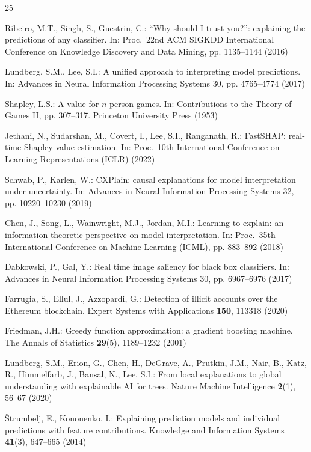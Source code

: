 \documentclass[runningheads]{llncs}
\begin{document}
\begin{thebibliography}{25}

Ribeiro, M.T., Singh, S., Guestrin, C.: ``Why should I trust you?'':
explaining the predictions of any classifier. In: Proc.\ 22nd ACM SIGKDD
International Conference on Knowledge Discovery and Data Mining,
pp. 1135--1144 (2016)

Lundberg, S.M., Lee, S.I.: A unified approach to interpreting model
predictions. In: Advances in Neural Information Processing Systems 30,
pp. 4765--4774 (2017)

Shapley, L.S.: A value for $n$-person games. In: Contributions to the
Theory of Games II, pp. 307--317. Princeton University Press (1953)

Jethani, N., Sudarshan, M., Covert, I., Lee, S.I., Ranganath, R.: FastSHAP:
real-time Shapley value estimation. In: Proc.\ 10th International
Conference on Learning Representations (ICLR) (2022)

Schwab, P., Karlen, W.: CXPlain: causal explanations for model
interpretation under uncertainty. In: Advances in Neural Information
Processing Systems 32, pp. 10220--10230 (2019)

Chen, J., Song, L., Wainwright, M.J., Jordan, M.I.: Learning to explain: an
information-theoretic perspective on model interpretation. In: Proc.\ 35th
International Conference on Machine Learning (ICML), pp. 883--892 (2018)

Dabkowski, P., Gal, Y.: Real time image saliency for black box classifiers.
In: Advances in Neural Information Processing Systems 30, pp. 6967--6976
(2017)

Farrugia, S., Ellul, J., Azzopardi, G.: Detection of illicit accounts over
the Ethereum blockchain. Expert Systems with Applications \textbf{150},
113318 (2020)

Friedman, J.H.: Greedy function approximation: a gradient boosting machine.
The Annals of Statistics \textbf{29}(5), 1189--1232 (2001)

Lundberg, S.M., Erion, G., Chen, H., DeGrave, A., Prutkin, J.M., Nair, B.,
Katz, R., Himmelfarb, J., Bansal, N., Lee, S.I.: From local explanations to
global understanding with explainable AI for trees. Nature Machine
Intelligence \textbf{2}(1), 56--67 (2020)

\v{S}trumbelj, E., Kononenko, I.: Explaining prediction models and
individual predictions with feature contributions. Knowledge and
Information Systems \textbf{41}(3), 647--665 (2014)


\end{thebibliography}
\end{document}
